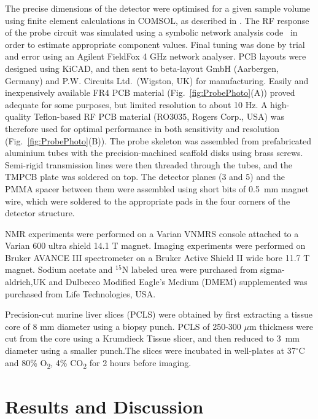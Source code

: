 \documentclass[preprint,5p]{elsarticle}
\newcommand{\fig}[1]{Fig.~\ref{#1}}
\begin{document}
The precise dimensions of the detector were optimised for a given sample volume using 
finite element calculations in COMSOL, as described in \cite{gream_2016}. 
The RF response of the probe circuit was simulated using a symbolic  
network analysis code~\cite{gream-thesis} in order to estimate appropriate component values. Final tuning
was done by trial and error using an Agilent FieldFox 4 GHz network analyser. 
PCB layouts were designed using KiCAD, and then sent to
beta-layout GmbH (Aarbergen, Germany) and P.W. Circuits Ltd.~(Wigston, UK) 
for manufacturing. Easily and inexpensively available FR4 PCB material
(\fig{fig:ProbePhoto}(A)) proved adequate for some purposes, but limited resolution to about 10 Hz.
A high-quality Teflon-based RF PCB material (RO3035, Rogers Corp., USA) was therefore used for optimal 
performance in both sensitivity and resolution (\fig{fig:ProbePhoto}(B)).
The probe skeleton was assembled from prefabricated aluminium tubes with the  precision-machined scaffold
disks using brass screws. Semi-rigid transmission lines were then threaded through the tubes, and the TMPCB plate was 
soldered on top. The detector planes (3 and 5) and the PMMA spacer between them were assembled using short bits
of 0.5~mm magnet wire, which were soldered to the appropriate pads in the four corners of the detector structure.

NMR experiments were performed on a Varian VNMRS console attached to a Varian 600 ultra shield 14.1 T magnet.  
Imaging experiments were performed on Bruker AVANCE III spectrometer on a Bruker Active Shield II wide bore 11.7 T 
magnet. 
Sodium acetate and $^{15}$N labeled urea were purchased from sigma-aldrich,UK and Dulbecco Modified Eagle's Medium (DMEM) supplemented was purchased from Life Technologies, USA.\par

Precision-cut murine liver slices (PCLS) were obtained by first extracting a tissue core of 8 mm diameter 
using a biopsy punch. PCLS of 250-300 $\mu$m thickness were cut from the core using a Krumdieck Tissue slicer, 
and then reduced to 3~mm diameter using a smaller punch.The slices were incubated in well-plates at 37$^\circ$C and 80\%
O\textsubscript{2}, 4\% CO\textsubscript{2}
for 2 hours before imaging.


\section{Results and Discussion}
\end{document}
